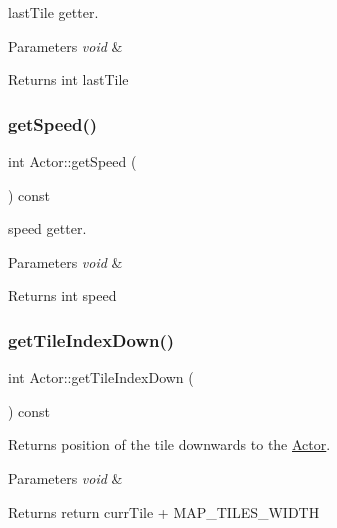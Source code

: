 last\+Tile getter. 


\begin{DoxyParams}{Parameters}
{\em void} & \\
\hline
\end{DoxyParams}
\begin{DoxyReturn}{Returns}
int last\+Tile 
\end{DoxyReturn}
\mbox{\label{class_actor_ab50ceeaf6192f75be8ed9b41d8c585fb}} 
\subsubsection{\texorpdfstring{get\+Speed()}{getSpeed()}}
{\footnotesize\ttfamily int Actor\+::get\+Speed (\begin{DoxyParamCaption}{ }\end{DoxyParamCaption}) const}



speed getter. 


\begin{DoxyParams}{Parameters}
{\em void} & \\
\hline
\end{DoxyParams}
\begin{DoxyReturn}{Returns}
int speed 
\end{DoxyReturn}
\mbox{\label{class_actor_a78388b58a561143504ff722a6625b564}} 
\subsubsection{\texorpdfstring{get\+Tile\+Index\+Down()}{getTileIndexDown()}}
{\footnotesize\ttfamily int Actor\+::get\+Tile\+Index\+Down (\begin{DoxyParamCaption}{ }\end{DoxyParamCaption}) const}



Returns position of the tile downwards to the \mbox{\hyperlink{class_actor}{Actor}}. 


\begin{DoxyParams}{Parameters}
{\em void} & \\
\hline
\end{DoxyParams}
\begin{DoxyReturn}{Returns}
return curr\+Tile + M\+A\+P\+\_\+\+T\+I\+L\+E\+S\+\_\+\+W\+I\+D\+TH 
\end{DoxyReturn}
\mbox{\label{class_actor_a0f751e7ea9030b58a8db19ccc62214f3}} 
